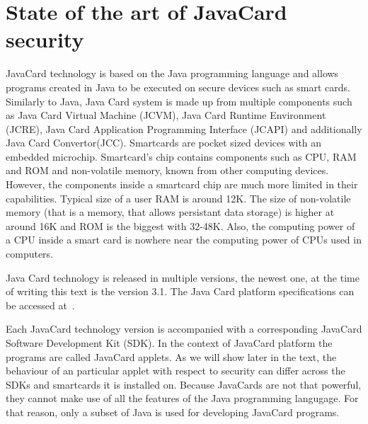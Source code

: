 \documentclass{../llncs/llncs}
\begin{document}
\section{State of the art of JavaCard security}
JavaCard technology is based on the Java programming language and allows programs created in Java to be executed on secure devices such as smart cards. Similarly to Java, Java Card system is made up from multiple components such as Java Card Virtual Machine (JCVM), Java Card Runtime Environment (JCRE), Java Card Application Programming Interface (JCAPI) and additionally Java Card Convertor(JCC).  Smartcards are pocket sized devices with an embedded microchip. Smartcard's chip contains components such as CPU, RAM and ROM and non-volatile memory, known from other computing devices. However, the components inside a smartcard chip are much more limited in their capabilities. Typical size of a user RAM is around 12K. The size of non-volatile memory (that is a memory, that allows persistant data storage) is higher at around 16K and ROM is the biggest with 32-48K. Also, the computing power of a CPU inside a smart card is nowhere near the computing power of CPUs used in computers.

Java Card technology is released in multiple versions, the newest one, at the time of writing this text is the version 3.1. The Java Card platform specifications can be accessed at~\cite{jcspecs31download}.


Each JavaCard technology version is accompanied with a corresponding JavaCard Software Development Kit (SDK).
In the context of JavaCard platform the programs are called JavaCard applets. As we will show later in the text, the behaviour of an particular applet with respect to security can differ across the SDKs and smartcards it is installed on.
Because JavaCards are not that powerful, they cannot make use of all the features of the Java programming langugage. For that reason, only a subset of Java is used for developing JavaCard programs.
\end{document}
